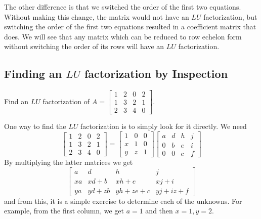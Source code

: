 \documentclass{ximera}
\begin{document}
The other difference is that we switched the order of the first two equations.  Without making this change, the matrix would not have an $LU$ factorization, but switching the order of the first two equations resulted in a coefficient matrix that does.  We will see that any matrix which can be reduced to row echelon form without switching the order of its rows will have an $LU$ factorization.

\subsection*{Finding an $LU$ factorization by Inspection}

\begin{example}\label{ex:LU1}
Find an $LU$ factorization of $A=
\begin{bmatrix}
1 & 2 & 0 & 2 \\
1 & 3 & 2 & 1 \\
2 & 3 & 4 & 0%
\end{bmatrix}
.$
\end{example}

One way to find the $LU$ factorization%
 is to simply look for it directly.
We need
\[
\begin{bmatrix}
1 & 2 & 0 & 2 \\
1 & 3 & 2 & 1 \\
2 & 3 & 4 & 0
\end{bmatrix}
=
\begin{bmatrix}
1 & 0 & 0 \\
x & 1 & 0 \\
y & z & 1
\end{bmatrix} 
\begin{bmatrix}
a & d & h & j \\
0 & b & e & i \\
0 & 0 & c & f
\end{bmatrix}
\]
By multiplying the latter matrices we get
\[
\begin{bmatrix}
a & d & h & j \\
xa & xd+b & xh+e & xj+i \\
ya & yd+zb & yh+ze+c & yj+iz+f
\end{bmatrix}
\]
and from this, it is a simple exercise to determine each of the unknowns. For example, from the first
column, we get $a=1$ and then $x=1,y=2.$ 

\end{document}
